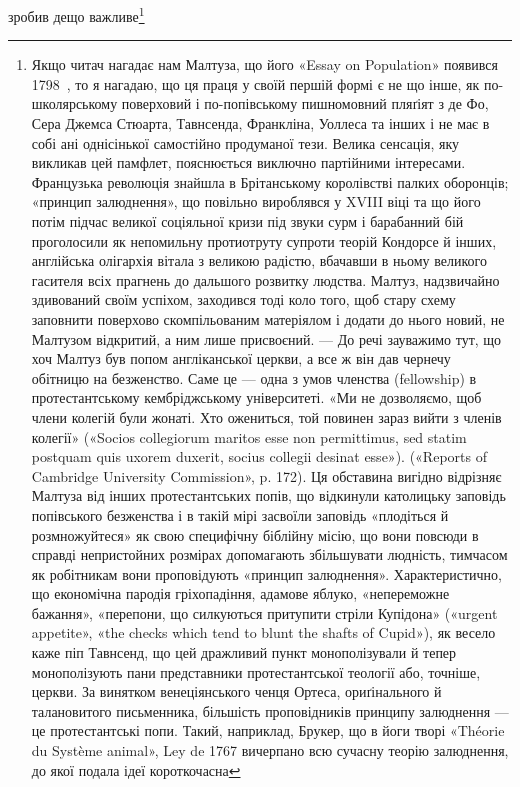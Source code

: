 зробив дещо важливе\footnote{
Якщо читач нагадає нам Малтуза, що його «Essay on Population»
появився 1798~, то я нагадаю, що ця праця у своїй першій формі є не
що інше, як по-школярському поверховий і по-попівському пишномовний
пляґіят з де Фо, Сера Джемса Стюарта, Тавнсенда, Франкліна, Уоллеса
та інших і не має в собі ані однісінької самостійно продуманої тези. Велика
сенсація, яку викликав цей памфлет, пояснюється виключно партійними
інтересами. Французька революція знайшла в Брітанському королівстві
палких оборонців; «принцип залюднення», що повільно вироблявся у
XVIII віці та що його потім підчас великої соціяльної кризи під звуки
сурм і барабанний бій проголосили як непомильну протиотруту супроти
теорій Кондорсе й інших, англійська олігархія вітала з великою радістю,
вбачавши в ньому великого гасителя всіх прагнень до дальшого розвитку
людства. Малтуз, надзвичайно здивований своїм успіхом, заходився тоді
коло того, щоб стару схему заповнити поверхово скомпільованим матеріялом
і додати до нього новий, не Малтузом відкритий, а ним лише
присвоєний. — До речі зауважимо тут, що хоч Малтуз був попом англіканської
церкви, а все ж він дав чернечу обітницю на безженство.
Саме це — одна з умов членства (fellowship) в протестантському кембріджському
університеті. «Ми не дозволяємо, щоб члени колегій були
жонаті. Хто ожениться, той повинен зараз вийти з членів колегії» («Socios
collegiorum maritos esse non permittimus, sed statim postquam quis
uxorem duxerit, socius collegii desinat esse»). («Reports of Cambridge University
Commission», p. 172). Ця обставина вигідно відрізняє Малтуза
від інших протестантських попів, що відкинули католицьку заповідь
попівського безженства і в такій мірі засвоїли заповідь «плодіться й
розмножуйтеся» як свою специфічну біблійну місію, що вони повсюди
в справді непристойних розмірах допомагають збільшувати людність,
тимчасом як робітникам вони проповідують «принцип залюднення».
Характеристично, що економічна пародія гріхопадіння, адамове яблуко,
«непереможне бажання», «перепони, що силкуються притупити стріли
Купідона» («urgent appetite», «the checks which tend to blunt the shafts
of Cupid»), як весело каже піп Тавнсенд, що цей дражливий пункт монополізували
й тепер монополізують пани представники протестантської
теології або, точніше, церкви. За винятком венеціянського ченця Ортеса,
ориґінального й талановитого письменника, більшість проповідників
принципу залюднення — це протестантські попи. Такий, наприклад,
Брукер, що в йоги творі «Théorie du Système animal», Ley de 1767 вичерпано
всю сучасну теорію залюднення, до якої подала ідеї короткочасна
}
